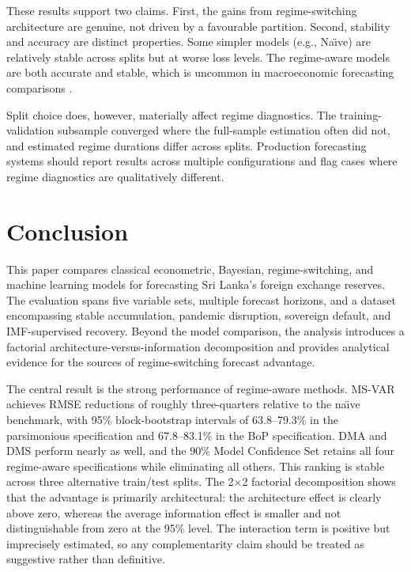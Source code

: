 \documentclass[12pt,a4paper]{article}
\begin{document}
These results support two claims. First, the gains from regime-switching architecture are genuine, not driven by a favourable partition. Second, stability and accuracy are distinct properties. Some simpler models (e.g., Na\"{\i}ve) are relatively stable across splits but at worse loss levels. The regime-aware models are both accurate and stable, which is uncommon in macroeconomic forecasting comparisons \citep{Rossi2013}.

Split choice does, however, materially affect regime diagnostics. The training-validation subsample converged where the full-sample estimation often did not, and estimated regime durations differ across splits. Production forecasting systems should report results across multiple configurations and flag cases where regime diagnostics are qualitatively different.

\section{Conclusion}

This paper compares classical econometric, Bayesian, regime-switching, and machine learning models for forecasting Sri Lanka's foreign exchange reserves. The evaluation spans five variable sets, multiple forecast horizons, and a dataset encompassing stable accumulation, pandemic disruption, sovereign default, and IMF-supervised recovery. Beyond the model comparison, the analysis introduces a factorial architecture-versus-information decomposition and provides analytical evidence for the sources of regime-switching forecast advantage.

The central result is the strong performance of regime-aware methods. MS-VAR achieves RMSE reductions of roughly three-quarters relative to the na\"{\i}ve benchmark, with 95\% block-bootstrap intervals of 63.8--79.3\% in the parsimonious specification and 67.8--83.1\% in the BoP specification. DMA and DMS perform nearly as well, and the 90\% Model Confidence Set retains all four regime-aware specifications while eliminating all others. This ranking is stable across three alternative train/test splits. The 2$\times$2 factorial decomposition shows that the advantage is primarily architectural: the architecture effect is clearly above zero, whereas the average information effect is smaller and not distinguishable from zero at the 95\% level. The interaction term is positive but imprecisely estimated, so any complementarity claim should be treated as suggestive rather than definitive.
\end{document}

